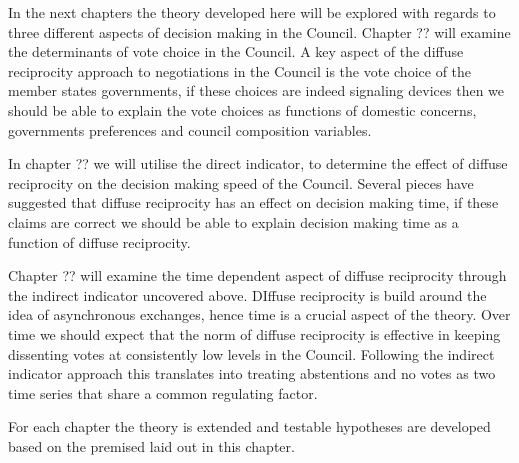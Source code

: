 In the next chapters the theory developed here will be explored with regards to three different aspects of decision making in the Council. Chapter ?? will examine the determinants of vote choice in the Council. A key aspect of the diffuse reciprocity approach to negotiations in the Council is the vote choice of the member states governments, if these choices are indeed signaling devices then we should be able to explain the vote choices as functions of domestic concerns, governments preferences and council composition variables.

In chapter ?? we will utilise the direct indicator, to determine the effect of diffuse reciprocity on the decision making speed of the Council. Several pieces have suggested that diffuse reciprocity has an effect on decision making time, if these claims are correct we should be able to explain decision making time as a function of diffuse reciprocity.

Chapter ?? will examine the time dependent aspect of diffuse reciprocity through the indirect indicator uncovered above. DIffuse reciprocity is build around the idea of asynchronous exchanges, hence time is a crucial aspect of the theory. Over time we should expect that the norm of diffuse reciprocity is effective in keeping dissenting votes at consistently low levels in the Council. Following the indirect indicator approach this translates into treating abstentions and no votes as two time series that share a common regulating factor. 

For each chapter the theory is extended and testable hypotheses are developed based on the premised laid out in this chapter. 

